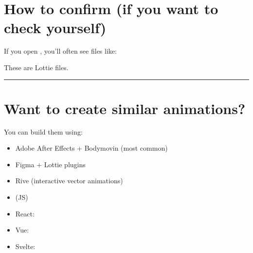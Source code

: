 \documentclass[letterpaper,10pt,english]{sphinxmanual}
\begin{document}
\chapter{How to confirm (if you want to check yourself)}
\label{\detokenize{web-design:how-to-confirm-if-you-want-to-check-yourself}}
\sphinxAtStartPar
If you open , you’ll often
see files like:

\begin{sphinxVerbatim}[commandchars=\\\{\}]
\end{sphinxVerbatim}

\sphinxAtStartPar
These are Lottie files.


\bigskip\hrule\bigskip



\chapter{Want to create similar animations?}
\label{\detokenize{web-design:want-to-create-similar-animations}}
\sphinxAtStartPar
You can build them using:
\begin{itemize}
\item {} 
\sphinxAtStartPar
Adobe After Effects + Bodymovin (most common)

\item {} 
\sphinxAtStartPar
Figma + Lottie plugins

\item {} 
\sphinxAtStartPar
Rive (interactive vector animations)

\end{itemize}
\begin{itemize}
\item {} 
\sphinxAtStartPar
{} (JS)

\item {} 
\sphinxAtStartPar
React: 

\item {} 
\sphinxAtStartPar
Vue: 

\item {} 
\sphinxAtStartPar
Svelte: 

\end{itemize}
\end{document}
